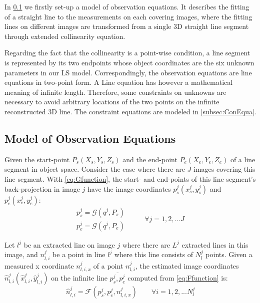 In \cref{subsec:ObsEqua} we firstly set-up a model of observation equations. It describes the fitting of a straight line to the measurements on each covering images, where the fitting lines on different images are transformed from a single 3D straight line segment through extended collinearity equation.

Regarding the fact that the collinearity is a point-wise condition, a line segment is represented by its two endpoints whose object coordinates are the six unknown parameters in our LS model. Correspondingly, the observation equations are line equations in two-point form. A Line equation has however a mathematical meaning of infinite length. Therefore, some constraints on unknowns are necessary to avoid arbitrary locations of the two points on the infinite reconstructed 3D line. The constraint equations are modeled in \cref{subsec:ConEqua}.






\subsection{Model of Observation Equations}
\label{subsec:ObsEqua}

Given the start-point $P_s(X_s,Y_s,Z_s)$ and the end-point $P_e(X_e,Y_e,Z_e)$ of a line segment in object space. Consider the case where there are $J$ images covering this line segment. With \cref{eq:Gfunction}, the start- and end-points of this line segment's back-projection in image $j$ have the image coordinates $p^j_s(x^j_s,y^j_s)$ and $p^j_e(x^j_e,y^j_e)$:
\begin{equation} \label{eq:obsmodel-collinearity}
\begin{split}
p^j_s = \mathcal{G}(q^j,P_s)\\
p^j_e = \mathcal{G}(q^j,P_e)
\end{split}
\qquad
\begin{split}
\forall j=1,2,...J
\end{split}
\end{equation}

Let $l^j$ be an extracted line on image $j$ where there are $L^j$ extracted lines in this image, and $n^j_{l,i}$ be a point in line $l^j$ where this line consists of $N^j_l$ points. Given a measured x coordinate $n^j_{l,i,x}$ of a point $n^j_{l,i}$, the estimated image coordinates $\hat{n}^j_{l,i}(\hat{x}^j_{l,i},\hat{y}^j_{l,i})$ on the infinite line $\overline{p^j_s,p^j_e}$ computed from \cref{eq:Ffunction} is:
\begin{equation} \label{eq:obsmodel-linefitting}
\hat{n}^j_{l,i} = \mathcal{F}(p^j_s,p^j_e,n^j_{l,i,x})
\qquad
\forall i=1,2,...N^j_l
\end{equation}

